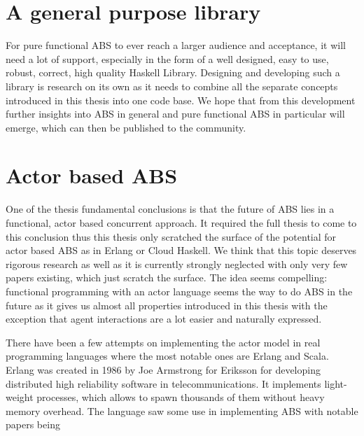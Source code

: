 \section{A general purpose library}
For pure functional ABS to ever reach a larger audience and acceptance, it will need a lot of support, especially in the form of a well designed, easy to use, robust, correct, high quality Haskell Library. Designing and developing such a library is research on its own as it needs to combine all the separate concepts introduced in this thesis into one code base. We hope that from this development further insights into ABS in general and pure functional ABS in particular will emerge, which can then be published to the community.


\section{Actor based ABS}
One of the thesis fundamental conclusions is that the future of ABS lies in a functional, actor based concurrent approach. It required the full thesis to come to this conclusion thus this thesis only scratched the surface of the potential for actor based ABS as in Erlang or Cloud Haskell. We think that this topic deserves rigorous research as well as it is currently strongly neglected with only very few papers existing, which just scratch the surface. The idea seems compelling: functional programming with an actor language seems the way to do ABS in the future as it gives us almost all properties introduced in this thesis with the exception that agent interactions are a lot easier and naturally expressed.

There have been a few attempts on implementing the actor model in real programming languages where the most notable ones are Erlang and Scala. Erlang was created in 1986 by Joe Armstrong for Eriksson for developing distributed high reliability software in telecommunications. It implements light-weight processes, which allows to spawn thousands of them without heavy memory overhead. The language saw some use in implementing ABS with notable papers being \cite{di_stefano_using_2005, di_stefano_exat:_2007, varela_modelling_2004, sher_agent-based_2013, bezirgiannis_improving_2013}

